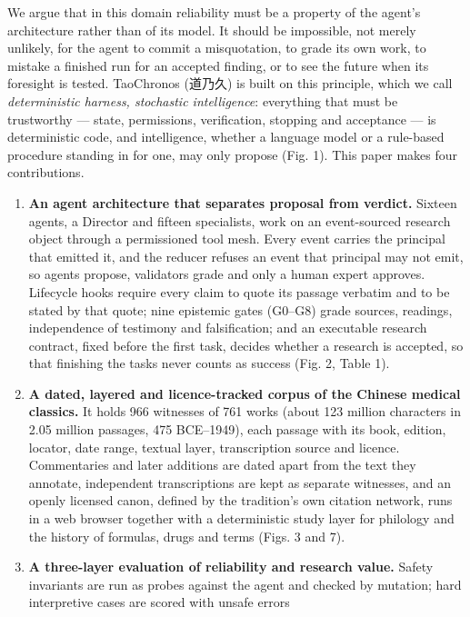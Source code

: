\documentclass[
]{article}
\providecommand{\tightlist}{%
  \setlength{\itemsep}{0pt}\setlength{\parskip}{0pt}}
\begin{document}
We argue that in this domain reliability must be a property of the
agent's architecture rather than of its model. It should be impossible,
not merely unlikely, for the agent to commit a misquotation, to grade
its own work, to mistake a finished run for an accepted finding, or to
see the future when its foresight is tested. TaoChronos (道乃久) is
built on this principle, which we call \emph{deterministic harness,
stochastic intelligence}: everything that must be trustworthy --- state,
permissions, verification, stopping and acceptance --- is deterministic
code, and intelligence, whether a language model or a rule-based
procedure standing in for one, may only propose (Fig. 1). This paper
makes four contributions.

\begin{enumerate}
\def\labelenumi{\arabic{enumi}.}
\tightlist
\item
  \textbf{An agent architecture that separates proposal from verdict.}
  Sixteen agents, a Director and fifteen specialists, work on an
  event-sourced research object through a permissioned tool mesh. Every
  event carries the principal that emitted it, and the reducer refuses
  an event that principal may not emit, so agents propose, validators
  grade and only a human expert approves. Lifecycle hooks require every
  claim to quote its passage verbatim and to be stated by that quote;
  nine epistemic gates (G0--G8) grade sources, readings, independence of
  testimony and falsification; and an executable research contract,
  fixed before the first task, decides whether a research is accepted,
  so that finishing the tasks never counts as success (Fig. 2, Table 1).
\item
  \textbf{A dated, layered and licence-tracked corpus of the Chinese
  medical classics.} It holds 966 witnesses of 761 works (about 123
  million characters in 2.05 million passages, 475 BCE--1949), each
  passage with its book, edition, locator, date range, textual layer,
  transcription source and licence. Commentaries and later additions are
  dated apart from the text they annotate, independent transcriptions
  are kept as separate witnesses, and an openly licensed canon, defined
  by the tradition's own citation network, runs in a web browser
  together with a deterministic study layer for philology and the
  history of formulas, drugs and terms (Figs. 3 and 7).
\item
  \textbf{A three-layer evaluation of reliability and research value.}
  Safety invariants are run as probes against the agent and checked by
  mutation; hard interpretive cases are scored with unsafe errors

\end{enumerate}
\end{document}
